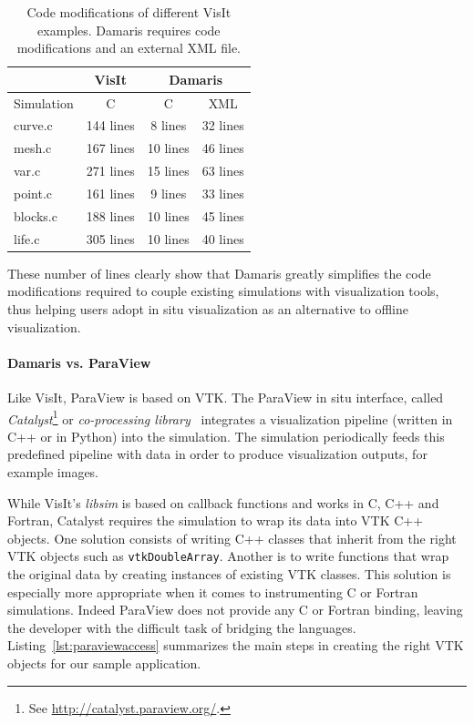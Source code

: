 \begin{table}
 \caption[Amount of code modifications in example codes using VisIt and Damaris]{Code 
   modifications of different VisIt examples. Damaris requires
   code modifications and an external XML file.}\label{tab:instrumentation:visit}
   \begin{tabular}{|l|c|c|c|}
      \hline
   & \textbf{VisIt} & \multicolumn{2}{c|}{\textbf{Damaris}} \\
      \hline
Simulation   & C  & C & XML \\
      \hline
      curve.c  & 144 lines & 8  lines & 32 lines\\
      mesh.c   & 167 lines & 10 lines & 46 lines\\
      var.c    & 271 lines & 15 lines & 63 lines\\
	  point.c  & 161 lines & 9  lines & 33 lines\\
	  blocks.c & 188 lines & 10 lines & 45 lines\\
      life.c   & 305 lines & 10 lines & 40 lines\\
      \hline
   \end{tabular}
   
\end{table}

These number of lines clearly show that Damaris greatly simplifies the code
modifications required to couple existing simulations with visualization tools,
thus helping users adopt in situ visualization as an alternative to offline
visualization.

\paragraph{Damaris vs. ParaView}
Like VisIt, ParaView is based on VTK. 
The ParaView in situ interface, called \emph{Catalyst}\footnote{See \url{http://catalyst.paraview.org/}.} 
or \emph{co-processing library}~\cite{fabian2011paraview} integrates a visualization pipeline 
(written in C++ or in Python) into the simulation. The simulation periodically 
feeds this predefined pipeline with data in order to produce visualization 
outputs, for example images.

While VisIt's \emph{libsim} is based on callback functions and works in C, C++ 
and Fortran, Catalyst requires the simulation to wrap 
its data into VTK C++ objects. One solution consists of writing C++ classes that 
inherit from the right VTK objects such as \texttt{vtkDoubleArray}. Another is 
to write functions that wrap the original data by creating instances of existing
VTK classes. This solution is especially more appropriate when it comes to 
instrumenting C or Fortran simulations. Indeed ParaView does not provide any C or 
Fortran binding, leaving the developer with the difficult task of bridging the languages.
Listing~\ref{lst:paraviewaccess} summarizes the main steps in creating the
right VTK objects for our sample application.

